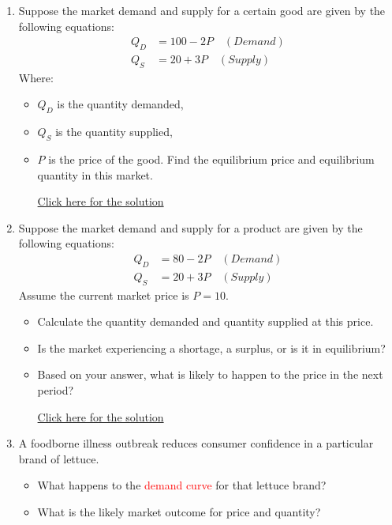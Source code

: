 \documentclass[
]{book}
\providecommand{\tightlist}{%
  \setlength{\itemsep}{0pt}\setlength{\parskip}{0pt}}
\begin{document}
\begin{enumerate}
\def\labelenumi{\arabic{enumi}.}
\tightlist
\item
  Suppose the market demand and supply for a certain good are given by the following equations:
  \begin{align*}
  Q_D &= 100 - 2P \quad (Demand) \\
  Q_S &= 20 + 3P \quad (Supply)
  \end{align*}
  Where:

  \begin{itemize}
  \tightlist
  \item
    \(Q_D\) is the quantity demanded,
  \item
    \(Q_S\) is the quantity supplied,
  \item
    \(P\) is the price of the good.
    Find the equilibrium price and equilibrium quantity in this market.

    \href{https://youtu.be/Abb7bN8yySg}{Click here for the solution}
  \end{itemize}
\item
  Suppose the market demand and supply for a product are given by the following equations:
  \begin{align*}
  Q_D &= 80 - 2P \quad (Demand) \\
  Q_S &= 20 + 3P \quad (Supply)
  \end{align*}
  Assume the current market price is \(P = 10\).

  \begin{itemize}
  \tightlist
  \item
    Calculate the quantity demanded and quantity supplied at this price.
  \item
    Is the market experiencing a shortage, a surplus, or is it in equilibrium?
  \item
    Based on your answer, what is likely to happen to the price in the next period?

    \href{https://youtu.be/SKh2EvI4YLc}{Click here for the solution}
  \end{itemize}
\item
  A foodborne illness outbreak reduces consumer confidence in a particular brand of lettuce.

  \begin{itemize}
  \tightlist
  \item
    What happens to the \textcolor{red}{demand curve} for that lettuce brand?
  \item
    What is the likely market outcome for price and quantity?


\end{itemize}
\end{enumerate}
\end{document}
